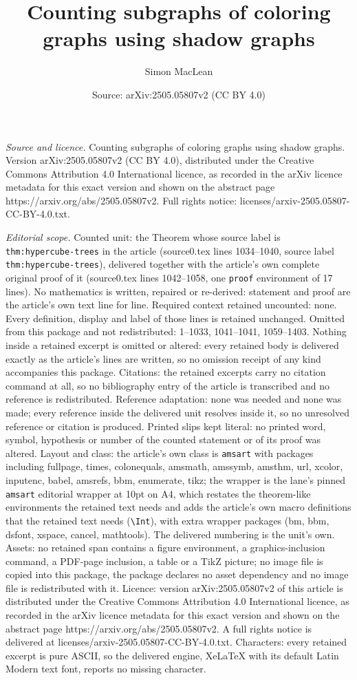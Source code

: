\documentclass[10pt,a4paper]{amsart}
\title[Counting subgraphs of coloring graphs using shadow graphs]{Counting subgraphs of coloring graphs using shadow graphs}
\author{Simon MacLean}
\date{Source: arXiv:2505.05807v2 (CC BY 4.0)}
\begin{document}
\maketitle

\noindent\emph{Source and licence.} Counting subgraphs of coloring graphs using shadow graphs. Version arXiv:2505.05807v2 (CC BY 4.0), distributed under the Creative Commons Attribution 4.0 International licence, as recorded in the arXiv licence metadata for this exact version and shown on the abstract page https://arxiv.org/abs/2505.05807v2. Full rights notice: licenses/arxiv-2505.05807-CC-BY-4.0.txt.\par\smallskip

\noindent\textit{Editorial scope.} Counted unit: the Theorem whose source label is \texttt{thm:hypercube-trees} in the article (source0.tex lines 1034--1040, source label \texttt{thm:hypercube-trees}), delivered together with the article's own complete original proof of it (source0.tex lines 1042--1058, one \texttt{proof} environment of 17 lines). No mathematics is written, repaired or re-derived: statement and proof are the article's own text line for line. Required context retained uncounted: none. Every definition, display and label of those lines is retained unchanged. Omitted from this package and not redistributed: 1--1033, 1041--1041, 1059--1403. Nothing inside a retained excerpt is omitted or altered: every retained body is delivered exactly as the article's lines are written, so no omission receipt of any kind accompanies this package. Citations: the retained excerpts carry no citation command at all, so no bibliography entry of the article is transcribed and no reference is redistributed. Reference adaptation: none was needed and none was made; every reference inside the delivered unit resolves inside it, so no unresolved reference or citation is produced. Printed slips kept literal: no printed word, symbol, hypothesis or number of the counted statement or of its proof was altered. Layout and class: the article's own class is \texttt{amsart} with packages including fullpage, times, colonequals, amsmath, amssymb, amsthm, url, xcolor, inputenc, babel, amsrefs, bbm, enumerate, tikz; the wrapper is the lane's pinned \texttt{amsart} editorial wrapper at 10pt on A4, which restates the theorem-like environments the retained text needs and adds the article's own macro definitions that the retained text needs (\texttt{\textbackslash Int}), with extra wrapper packages (bm, bbm, dsfont, xspace, cancel, mathtools). The delivered numbering is the unit's own. Assets: no retained span contains a figure environment, a graphics-inclusion command, a PDF-page inclusion, a table or a TikZ picture; no image file is copied into this package, the package declares no asset dependency and no image file is redistributed with it. Licence: version arXiv:2505.05807v2 of this article is distributed under the Creative Commons Attribution 4.0 International licence, as recorded in the arXiv licence metadata for this exact version and shown on the abstract page https://arxiv.org/abs/2505.05807v2. A full rights notice is delivered at licenses/arxiv-2505.05807-CC-BY-4.0.txt. Characters: every retained excerpt is pure ASCII, so the delivered engine, XeLaTeX with its default Latin Modern text font, reports no missing character.
\end{document}

